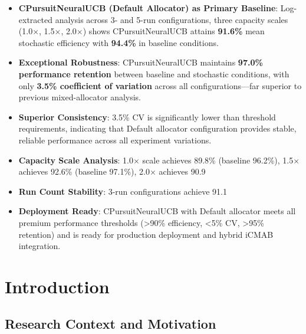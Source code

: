 \documentclass[12pt,a4paper]{article}
\newcommand{\primarytext}[1]{\textcolor{primaryblue}{\textbf{#1}}}
\newcommand{\success}[1]{\textcolor{accentgreen}{\textbf{#1}}}
\begin{document}
\begin{tcolorbox}[colback=highlightgray,colframe=primaryblue,title=\textbf{Executive Summary - Key Findings (Default Allocator Only)}]
\begin{itemize}
    \item \primarytext{CPursuitNeuralUCB (Default Allocator) as Primary Baseline}: Log-extracted analysis across 3- and 5-run configurations, three capacity scales (1.0$\times$, 1.5$\times$, 2.0$\times$) shows CPursuitNeuralUCB attains \success{91.6\%} mean stochastic efficiency with \success{94.4\%} in baseline conditions.
    
    \item \success{Exceptional Robustness}: CPursuitNeuralUCB maintains \success{97.0\% performance retention} between baseline and stochastic conditions, with only \success{3.5\% coefficient of variation} across all configurations---far superior to previous mixed-allocator analysis.
    
    \item \success{Superior Consistency}: 3.5\% CV is significantly lower than threshold requirements, indicating that Default allocator configuration provides stable, reliable performance across all experiment variations.
    
    \item \success{Capacity Scale Analysis}: 1.0$\times$ scale achieves 89.8\% (baseline 96.2\%), 1.5$\times$ achieves 92.6\% (baseline 97.1\%), 2.0$\times$ achieves 90.9%
    
    \item \success{Run Count Stability}: 3-run configurations achieve 91.1%
    
    \item \success{Deployment Ready}: CPursuitNeuralUCB with Default allocator meets all premium performance thresholds (>90\% efficiency, <5\% CV, >95\% retention) and is ready for production deployment and hybrid iCMAB integration.
\end{itemize}
\end{tcolorbox}

\newpage
\section{Introduction}

\subsection{Research Context and Motivation}
\end{document}
